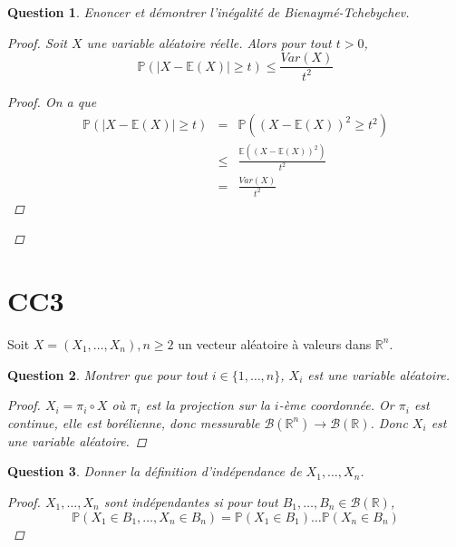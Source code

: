 \documentclass{article}
\theoremstyle{plain}
\newtheorem{question}{Question}
\begin{document}
\begin{question}
	Enoncer et démontrer l'inégalité de Bienaymé-Tchebychev.
	\begin{proof}
		Soit $X$ une variable aléatoire réelle. Alors pour tout $t > 0$,
		\begin{equation*}
			\mathbb{P} (|X - \mathbb{E} (X)| \geq t) \le \frac{Var(X)}{t^2}
		\end{equation*}
		\begin{proof}
			On a que
			\begin{eqnarray*}
				\mathbb{P} (|X - \mathbb{E} (X)| \geq t) &=& \mathbb{P} ((X - \mathbb{E} (X))^2 \geq t^2) \\
				&\le& \frac{\mathbb{E} ((X - \mathbb{E} (X))^2)}{t^2} \\
				&=& \frac{Var(X)}{t^2}
			\end{eqnarray*}
		\end{proof}
	\end{proof}
\end{question}



\section{CC3}

Soit $X = (X_1, \dots, X_n), n \geq 2$ un vecteur aléatoire à valeurs dans $\mathbb{R}^n$.

\begin{question}
	Montrer que pour tout $i \in \{1, \dots, n\}$, $X_i$ est une variable aléatoire.
	\begin{proof}
		$X_i = \pi_i \circ X$ où $\pi_i$ est la projection sur la $i$-ème coordonnée. Or $\pi_i$ est continue,
		elle est borélienne, donc messurable $\mathscr{B} (\mathbb{R}^n) \to \mathscr{B} (\mathbb{R})$.
		Donc $X_i$ est une variable aléatoire.
	\end{proof}
\end{question}

\begin{question}
	Donner la définition d'indépendance de $X_1, \dots, X_n$.
	\begin{proof}
		$X_1, \dots, X_n$ sont indépendantes si pour tout $B_1, \dots, B_n \in \mathscr{B} (\mathbb{R})$,
		\begin{equation*}
			\mathbb{P} (X_1 \in B_1, \dots, X_n \in B_n) = \mathbb{P} (X_1 \in B_1) \dots \mathbb{P} (X_n \in B_n)
		\end{equation*}
	\end{proof}
\end{question}
\end{document}
